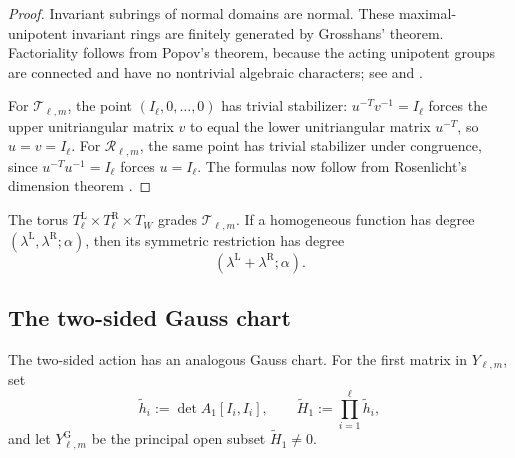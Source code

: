 \documentclass[11pt]{amsart}
\theoremstyle{definition}
\theoremstyle{remark}
\newcommand{\cR}{\mathcal R}
\newcommand{\cT}{\mathcal T}
\begin{document}
\begin{proof}
Invariant subrings of normal domains are normal.  These maximal-unipotent
invariant rings are finitely generated by Grosshans' theorem.  Factoriality
follows from Popov's theorem, because the acting unipotent groups are
connected and have no nontrivial algebraic characters; see
\cite[Theorem~3.17]{PopovVinberg} and \cite{Grosshans}.

For $\cT_{\ell,m}$, the point $(I_\ell,0,\ldots,0)$ has trivial stabilizer:
$u^{-T}v^{-1}=I_\ell$ forces the upper unitriangular matrix $v$ to equal the
lower unitriangular matrix $u^{-T}$, so $u=v=I_\ell$.  For $\cR_{\ell,m}$,
the same point has trivial stabilizer under congruence, since
$u^{-T}u^{-1}=I_\ell$ forces $u=I_\ell$.  The formulas now follow from Rosenlicht's dimension theorem
\cite{Rosenlicht}.
\end{proof}

The torus $T_\ell^{\mathrm L}\times T_\ell^{\mathrm R}\times T_W$ grades
$\cT_{\ell,m}$.  If a homogeneous function has degree
$(\lambda^{\mathrm L},\lambda^{\mathrm R};\alpha)$, then its symmetric
restriction has degree
\begin{equation}
 (\lambda^{\mathrm L}+\lambda^{\mathrm R};\alpha).
 \label{eq:degree-restriction}
\end{equation}

\subsection{The two-sided Gauss chart}
\label{subsec:two-sided-gaussian-slice}

The two-sided action has an analogous Gauss chart.  For the first
matrix in $Y_{\ell,m}$, set
\[ \widetilde h_i:=\det A_1[I_i,I_i], \qquad \widetilde H_1:=\prod_{i=1}^{\ell}\widetilde h_i, \]
and let $Y_{\ell,m}^{\mathrm G}$ be the principal open subset
$\widetilde H_1\ne0$.
\end{document}
